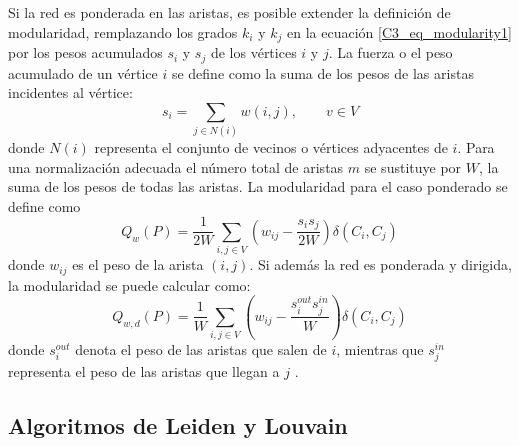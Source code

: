 Si la red es ponderada en las aristas, es posible extender la definición de modularidad, remplazando los grados $k_i$ y $k_j$ en la ecuación \ref{C3_eq_modularity1} por los pesos acumulados $s_i$ y $s_j$ de los vértices $i$ y $j$. La fuerza o el peso acumulado de un vértice $i$ se define como la suma de los pesos de las aristas incidentes  al vértice:
\begin{equation}
	s_i = \sum_{j \in N(i)} w(i,j), \qquad v\in V
\end{equation}
donde $N(i)$ representa el conjunto de vecinos o vértices adyacentes de $i$. Para una normalización adecuada el número total de aristas $m$ se sustituye por $W$, la suma de los pesos de todas las aristas. La modularidad para el caso ponderado se define como 
\begin{equation}
	Q_w(P) = \frac{1}{2W} \sum_{i,j\in V}\left(w_{ij} -\frac{s_is_j}{2W} \right)\delta(C_i, C_j)
\end{equation}
donde $w_{ij}$ es el peso de la arista $(i,j)$. Si además la red es ponderada y dirigida, la modularidad se puede calcular como:
\begin{equation}
	Q_{w,d}(P) = \frac{1}{W} \sum_{i,j\in V}\left(w_{ij} -\frac{s_i^{out}s_j^{in}}{W} \right)\delta(C_i, C_j)
	\label{C3_eq_modularity_directed_weighted}
\end{equation}
donde $s_i^{out}$ denota el peso de las aristas que salen de $i$, mientras que $s_j^{in}$ representa el peso de las aristas que llegan a $j$ \parencite[p.~107]{Fortunato2010}.


\subsection{Algoritmos de Leiden y Louvain} \label{LeidenLouvain}

